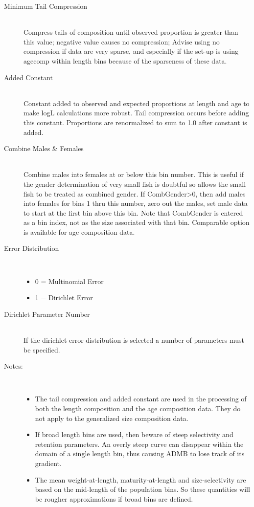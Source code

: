 \begin{description}
	\item[Minimum Tail Compression]\hfill\\
	Compress tails of composition until observed proportion is greater than this value; negative value causes no compression; Advise using no compression if data are very sparse, and especially if the set-up is using agecomp within length bins because of the sparseness of these data.
	\item[Added Constant]\hfill\\
	Constant added to observed and expected proportions at length and age to make logL calculations more robust.  Tail compression occurs before adding this constant.  Proportions are renormalized to sum to 1.0 after constant is added.
	\item[Combine Males \& Females]\hfill\\
	Combine males into females at or below this bin number.  This is useful if the gender determination of very small fish is doubtful so allows the small fish to be treated as combined gender.  If CombGender>0, then add males into females for bins 1 thru this number, zero out the males, set male data to start at the first bin above this bin.  Note that CombGender is entered as a bin index, not as the size associated with that bin.  Comparable option is available for age composition data.
	\item[Error Distribution]\
	\begin{itemize}
		\item 0 = Multinomial Error
		\item 1 = Dirichlet Error
	\end{itemize}
	\item[Dirichlet Parameter Number]\hfill\\
	If the dirichlet error distribution is selected a number of parameters must be specified.
	\item[Notes:]\
	\begin{itemize}
		\item The tail compression and added constant are used in the processing of both the length composition and the age composition data.  They do not apply to the generalized size composition data.
		\item If broad length bins are used, then beware of steep selectivity and retention parameters.  An overly steep curve can disappear within the domain of a single length bin, thus causing ADMB to lose track of its gradient.
		\item The mean weight-at-length, maturity-at-length and size-selectivity are based on the mid-length of the population bins.  So these quantities will be rougher approximations if broad bins are defined.

\end{itemize}
\end{description}
